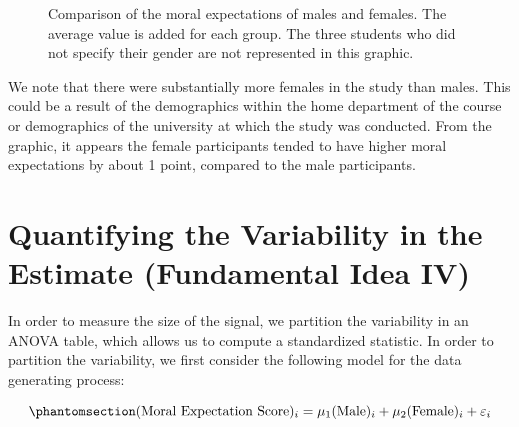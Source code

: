 \documentclass[
  letterpaper,
  DIV=11,
  numbers=noendperiod]{scrreprt}
\theoremstyle{definition}
\theoremstyle{definition}
\theoremstyle{plain}
\theoremstyle{remark}
\begin{document}
\begin{figure}


\caption{\label{fig-anovarecap-boxplot}Comparison of the moral
expectations of males and females. The average value is added for each
group. The three students who did not specify their gender are not
represented in this graphic.}

\end{figure}%

We note that there were substantially more females in the study than
males. This could be a result of the demographics within the home
department of the course or demographics of the university at which the
study was conducted. From the graphic, it appears the female
participants tended to have higher moral expectations by about 1 point,
compared to the male participants.

\section{Quantifying the Variability in the Estimate (Fundamental Idea
IV)}\label{quantifying-the-variability-in-the-estimate-fundamental-idea-iv-1}

In order to measure the size of the signal, we partition the variability
in an ANOVA table, which allows us to compute a standardized statistic.
In order to partition the variability, we first consider the following
model for the data generating process:

\begin{equation}\phantomsection\label{eq-anovarecap-model}{(\text{Moral Expectation Score})_i = \mu_1(\text{Male})_i + \mu_2 (\text{Female})_i + \varepsilon_i}\end{equation}
\end{document}
